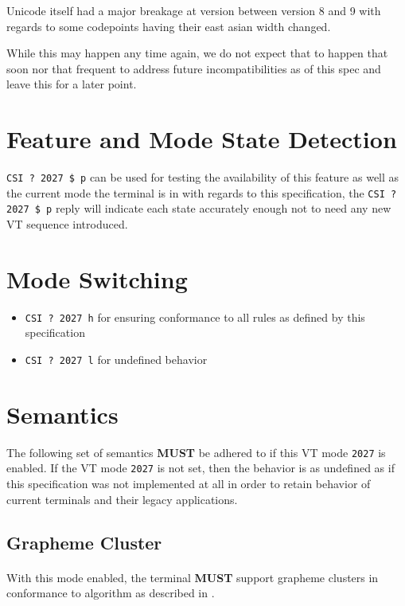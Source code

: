 \documentclass{article}
\newcommand{\code}[1]{\colorbox{light-gray}{\texttt{#1}}}
\newcommand{\DECRQM}[1]{\code{CSI ? #1 \$ p} }
\newcommand{\DECSET}[1]{\code{CSI ? #1 h} }
\newcommand{\DECRST}[1]{\code{CSI ? #1 l} }
\newcommand\VtModeNum{2027}                	%
\newcommand{\UCON}{\DECSET{\VtModeNum{}}}   %
\newcommand{\UCOFF}{\DECRST{\VtModeNum{}}}  %
\newcommand{\UCTEST}{\DECRQM{\VtModeNum{}}} %
\begin{document}
Unicode itself had a major breakage at version between version 8 and 9
with regards to some codepoints having their east asian width changed.

While this may happen any time again, we do not expect that to happen
that soon nor that frequent to address future incompatibilities
as of this spec and leave this for a later point.

\section{Feature and Mode State Detection}

\UCTEST \cite{DECRQM} can be used for testing the availability of this
feature as well as the current mode the terminal is in with regards
to this specification, the \UCTEST reply will indicate each state
accurately enough not to need any new VT sequence introduced.

\section{Mode Switching}

\begin{itemize}
	\item \UCON{} \cite{SM} for ensuring conformance to all rules as defined by this specification
	\item \UCOFF{} \cite{RM} for undefined behavior
\end{itemize}

\section{Semantics}

The following set of semantics \textbf{MUST} be adhered to if this
VT mode \code{\VtModeNum} is enabled.
If the VT mode \code{\VtModeNum} is not set, then the behavior is as undefined
as if this specification was not implemented at all in order to retain
behavior of current terminals and their legacy applications.

\subsection{Grapheme Cluster}

\paragraph*{}
With this mode enabled, the terminal \textbf{MUST} support grapheme clusters
in conformance to algorithm as described in \cite{UTS-29}.
\end{document}
